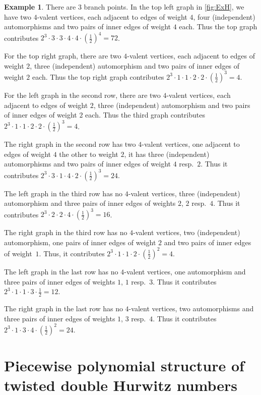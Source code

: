 \documentclass[10pt]{amsart}
\theoremstyle{plain}
\theoremstyle{definition}
\theoremstyle{definition}
\newtheorem{exam}[exam]{Example}
\theoremstyle{plain}
\theoremstyle{plain}
\theoremstyle{remark}
\theoremstyle{plain}
\theoremstyle{plain}
\begin{document}
\begin{exam}
There are $3$ branch points. In the top left graph in \cref{fig:ExH}, we have two $4$-valent vertices, each adjacent to edges of weight $4$, four (independent) automorphisms and two pairs of inner edges of weight $4$ each. Thus the top graph contributes $2^3 \cdot 3\cdot 3\cdot 4\cdot 4\cdot (\frac{1}{2})^4=72$.

For the top right graph, there are two $4$-valent vertices, each adjacent to edges of weight $2$, three (independent) automorphism and two pairs of inner edges of weight $2$ each. Thus the top right graph contributes $2^3\cdot 1\cdot 1\cdot 2\cdot 2\cdot (\frac{1}{2})^3=4$.

For the left graph in the second row, there are two $4$-valent vertices, each adjacent to edges of weight $2$, three (independent) automorphism and two pairs of inner edges of weight $2$ each. Thus the third graph contributes $2^3\cdot 1\cdot 1\cdot 2\cdot 2\cdot (\frac{1}{2})^3=4$.

The right graph in the second row has two $4$-valent vertices, one adjacent to edges of weight $4$ the other to weight $2$, it has three (independent) automorphisms and two pairs of inner edges of weight $4$ resp.\ $2$. Thus it contributes $2^3\cdot 3\cdot 1\cdot 4\cdot 2\cdot (\frac{1}{2})^3=24$.

The left graph in the third row has no $4$-valent vertices, three (independent) automorphism and three pairs of inner edges of weights $2$, $2$ resp.\ $4$. Thus it contributes $2^3\cdot 2\cdot 2\cdot 4\cdot (\frac{1}{2})^3=16$.

The right graph in the third row has no $4$-valent vertices, two (independent) automorphism, one pairs of inner edges of weight $2$ and two pairs of inner edges of weight~$1$. Thus, it contributes $2^3\cdot 1\cdot 1\cdot 2\cdot (\frac{1}{2})^2=4$.

The left graph in the last row has no $4$-valent vertices, one automorphism and three pairs of inner edges of weights $1$, $1$ resp.\ $3$. Thus it contributes $2^3\cdot 1\cdot 1\cdot 3\cdot \frac{1}{2}=12$.

The right graph in the last row has no $4$-valent vertices, two automorphisms and three pairs of inner edges of weights $1$, $3$ resp.\ $4$. Thus it contributes $2^3\cdot 1\cdot 3\cdot 4\cdot (\frac{1}{2})^2=24$.
\end{exam}

\section{Piecewise polynomial structure of twisted double Hurwitz numbers}
\label{sec:poly}
\end{document}
